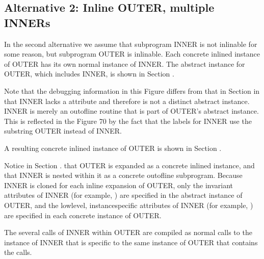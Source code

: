 \subsection{Alternative 2: Inline OUTER, multiple INNERs}
\label{app:inlineoutermultiipleinners}


In the second alternative we assume that subprogram INNER
is not inlinable for some reason, but subprogram OUTER is
inlinable. Each concrete inlined instance of OUTER has its
own normal instance of INNER. The abstract instance for OUTER,
which includes INNER, is shown in 
Section .

Note that the debugging information in this Figure differs from
that in 
Section 
in that INNER lacks a  attribute
and therefore is not a distinct abstract instance. INNER
is merely an out\dash of\dash line routine that is part of OUTER’s
abstract instance. This is reflected in the Figure 70 by
the fact that the labels for INNER use the substring OUTER
instead of INNER.

A resulting concrete inlined instance of OUTER is shown in
Section .

Notice in 
Section .
that OUTER is expanded as a concrete
inlined instance, and that INNER is nested within it as a
concrete out\dash of\dash line subprogram. Because INNER is cloned
for each inline expansion of OUTER, only the invariant
attributes of INNER 
(for example, ) are specified
in the abstract instance of OUTER, and the low\dash level,
instance\dash specific attributes of INNER (for example,
) are specified in each concrete instance of OUTER.

The several calls of INNER within OUTER are compiled as normal
calls to the instance of INNER that is specific to the same
instance of OUTER that contains the calls.


